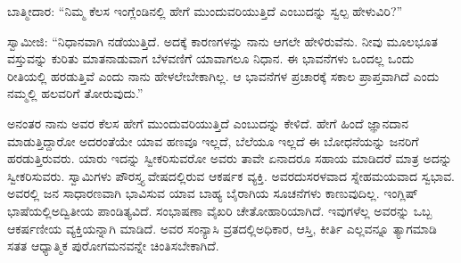 ಬಾತ್ಮೀದಾರ: “ನಿಮ್ಮ ಕೆಲಸ ಇಂಗ್ಲೆಂಡಿನಲ್ಲಿ ಹೇಗೆ ಮುಂದುವರಿಯುತ್ತಿದೆ ಎಂಬುದನ್ನು ಸ್ವಲ್ಪ ಹೇಳುವಿರಿ?”

ಸ್ವಾಮೀಜಿ: “ನಿಧಾನವಾಗಿ ನಡೆಯುತ್ತಿದೆ. ಅದಕ್ಕೆ ಕಾರಣಗಳನ್ನು ನಾನು ಆಗಲೇ ಹೇಳಿರುವೆನು. ನೀವು ಮೂಲಭೂತ ವಸ್ತುವನ್ನು ಕುರಿತು ಮಾತನಾಡುವಾಗ ಬೆಳವಣಿಗೆ ಯಾವಾಗಲೂ ನಿಧಾನ. ಈ ಭಾವನೆಗಳು ಒಂದಲ್ಲ ಒಂದು ರೀತಿಯಲ್ಲಿ ಹರಡುತ್ತಿವೆ ಎಂದು ನಾನು ಹೇಳಲೇಬೇಕಾಗಿಲ್ಲ. ಆ ಭಾವನೆಗಳ ಪ್ರಚಾರಕ್ಕೆ ಸಕಾಲ ಪ್ರಾಪ್ತವಾಗಿದೆ ಎಂದು ನಮ್ಮಲ್ಲಿ ಹಲವರಿಗೆ ತೋರುವುದು.”

ಅನಂತರ ನಾನು ಅವರ ಕೆಲಸ ಹೇಗೆ ಮುಂದುವರಿಯುತ್ತಿದೆ ಎಂಬುದನ್ನು ಕೇಳಿದೆ. ಹೇಗೆ ಹಿಂದೆ ಜ್ಞಾನದಾನ ಮಾಡುತ್ತಿದ್ದಾರೋ ಅದರಂತೆಯೇ ಯಾವ ಹಣವೂ ಇಲ್ಲದೆ, ಬೆಲೆಯೂ ಇಲ್ಲದೆ ಈ ಬೋಧನೆಯನ್ನು ಜನರಿಗೆ ಹರಡುತ್ತಿರುವರು. ಯಾರು ಇದನ್ನು ಸ್ವೀಕರಿಸುವರೋ ಅವರು ತಾವೇ ಏನಾದರೂ ಸಹಾಯ ಮಾಡಿದರೆ ಮಾತ್ರ ಅದನ್ನು ಸ್ವೀಕರಿಸುವರು. ಸ್ವಾಮಿಗಳು ಪೌರಸ್ತ್ಯ ವೇಷದಲ್ಲಿರುವ ಆಕರ್ಷಕ ವ್ಯಕ್ತಿ. ಅವರದು\break ಸರಳವಾದ ಸ್ನೇಹಮಯವಾದ ಸ್ವಭಾವ. ಅವರಲ್ಲಿ ಜನ ಸಾಧಾರಣವಾಗಿ ಭಾವಿಸುವ ಯಾವ ಬಾಹ್ಯ ಬೈರಾಗಿಯ ಸೂಚನೆಗಳು ಕಾಣುವುದಿಲ್ಲ. ಇಂಗ್ಲಿಷ್​ ಭಾಷೆಯಲ್ಲಿ\break ಅದ್ವಿತೀಯ ಪಾಂಡಿತ್ಯವಿದೆ. ಸಂಭಾಷಣಾ ವೈಖರಿ ಚೇತೋಹಾರಿಯಾಗಿದೆ. ಇವುಗಳೆಲ್ಲ ಅವರನ್ನು ಒಬ್ಬ ಆಕರ್ಷಣೀಯ ವ್ಯಕ್ತಿಯನ್ನಾಗಿ ಮಾಡಿದೆ. ಅವರ ಸಂನ್ಯಾಸಿ ವ್ರತದಲ್ಲಿ\break ಅಧಿಕಾರ, ಆಸ್ತಿ, ಕೀರ್ತಿ ಎಲ್ಲವನ್ನೂ ತ್ಯಾಗಮಾಡಿ ಸತತ ಆಧ್ಯಾತ್ಮಿಕ ಪುರೋಗಮನವನ್ನೇ ಚಿಂತಿಸಬೇಕಾಗಿದೆ.

